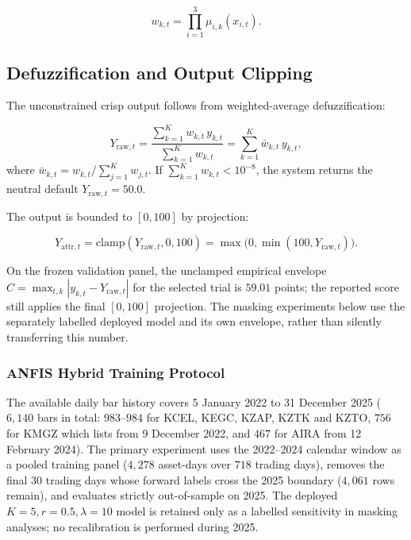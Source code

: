 \documentclass[pdflatex,sn-mathphys-num]{sn-jnl}
\theoremstyle{thmstyleone}
\theoremstyle{thmstyletwo}
\theoremstyle{thmstylethree}
\begin{document}
\begin{equation}
    w_{k,t} = \prod_{i=1}^{3} \mu_{i,k}(x_{i,t}).
    \label{eq:rule_firing}
\end{equation}

\subsection{Defuzzification and Output Clipping}\label{subsec3_3}

The unconstrained crisp output follows from weighted-average defuzzification:

\begin{equation}
    Y_{\mathrm{raw},t} = \frac{\sum_{k=1}^{K} w_{k,t} \, y_{k,t}}{\sum_{k=1}^{K} w_{k,t}} = \sum_{k=1}^{K} \bar{w}_{k,t} \, y_{k,t},
    \label{eq:defuzz_raw}
\end{equation}
where $\bar{w}_{k,t} = w_{k,t} / \sum_{j=1}^{K} w_{j,t}$. If $\sum_{k=1}^{K} w_{k,t} < 10^{-8}$, the system returns the neutral default $Y_{\mathrm{raw},t} = 50.0$.

The output is bounded to $[0,100]$ by projection:

\begin{equation}
    Y_{\mathrm{attr},t} = \mathrm{clamp}(Y_{\mathrm{raw},t}, 0, 100) = \max\bigl(0, \min(100, Y_{\mathrm{raw},t})\bigr).
    \label{eq:clipping}
\end{equation}

On the frozen validation panel, the unclamped empirical envelope
$C=\max_{t,k}|y_{k,t}-Y_{\mathrm{raw},t}|$ for the selected trial is $59.01$
points; the reported score still applies the final
$[0,100]$ projection. The masking experiments below use the separately labelled
deployed model and its own envelope, rather than silently transferring this
number.

\subsubsection{ANFIS Hybrid Training Protocol}\label{subsubsec3_3_1}

The available daily bar history covers 5 January 2022 to 31 December 2025 ($6{,}140$ bars in total: $983$--$984$ for KCEL, KEGC, KZAP, KZTK and KZTO, $756$ for KMGZ which lists from 9 December 2022, and $467$ for AIRA from 12 February 2024). The primary experiment uses the 2022--2024 calendar window as a pooled training panel ($4{,}278$ asset-days over $718$ trading days), removes the final 30 trading days whose forward labels cross the 2025 boundary ($4{,}061$ rows remain), and evaluates strictly out-of-sample on 2025. The deployed $K=5,r=0.5,\lambda=10$ model is retained only as a labelled sensitivity in masking analyses; no recalibration is performed during 2025.
\end{document}
